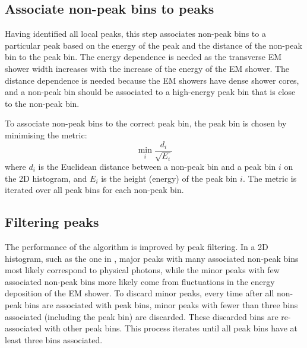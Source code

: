 \subsection{Associate non-peak bins to peaks}

Having identified all local peaks, this step associates non-peak bins to a particular peak based on the energy of the peak and the distance of the non-peak bin to the peak bin. The energy dependence is needed as the transverse EM shower width increases with the increase of the energy of the EM shower. The distance dependence is needed because the EM showers have dense shower cores, and a non-peak bin should be associated to a high-energy peak bin that is close to the non-peak bin.

To associate non-peak bins to the correct peak bin, the peak bin is chosen by minimising the metric:
\begin{equation}
\min_{i}\frac{d_{i}}{\sqrt{E_{i}}}
\end{equation}
where $d_{i}$ is the Euclidean distance between a non-peak bin and a  peak bin $i$ on the 2D histogram, and $E_{i}$ is the height (energy) of the peak bin $i$. The metric is iterated over all peak bins for each non-peak bin. %


\subsection{Filtering peaks}

The performance of the \peakFinding algorithm is improved by peak filtering. In a 2D histogram, such as the one in , major peaks with many associated non-peak bins most likely correspond to physical photons, while the minor peaks with few associated non-peak bins more likely come from fluctuations in the energy deposition of the EM shower. To discard minor peaks, every time after all non-peak bins are associated with peak bins, minor peaks with fewer than three bins associated (including the peak bin) are discarded. These discarded bins are re-associated with other peak bins. This  process iterates until all peak bins have at least three bins associated.


